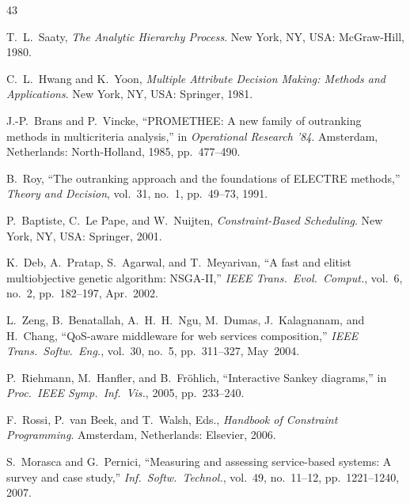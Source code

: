 \documentclass[journal]{IEEEtran}
\begin{document}

\begin{thebibliography}{43}

T.~L.~Saaty, \emph{The Analytic Hierarchy Process}. New York, NY, USA:
  McGraw-Hill, 1980.

C.~L.~Hwang and K.~Yoon, \emph{Multiple Attribute Decision Making: Methods and
  Applications}. New York, NY, USA: Springer, 1981.

J.-P.~Brans and P.~Vincke, ``PROMETHEE: A new family of outranking methods in
  multicriteria analysis,'' in \emph{Operational Research '84}. Amsterdam,
  Netherlands: North-Holland, 1985, pp.~477--490.

B.~Roy, ``The outranking approach and the foundations of ELECTRE methods,''
  \emph{Theory and Decision}, vol.~31, no.~1, pp.~49--73, 1991.

P.~Baptiste, C.~Le Pape, and W.~Nuijten, \emph{Constraint-Based Scheduling}.
  New York, NY, USA: Springer, 2001.

K.~Deb, A.~Pratap, S.~Agarwal, and T.~Meyarivan, ``A fast and elitist
  multiobjective genetic algorithm: NSGA-II,'' \emph{IEEE Trans.\ Evol.\
  Comput.}, vol.~6, no.~2, pp.~182--197, Apr.~2002.

L.~Zeng, B.~Benatallah, A.~H.~H.~Ngu, M.~Dumas, J.~Kalagnanam, and H.~Chang,
  ``QoS-aware middleware for web services composition,'' \emph{IEEE Trans.\ Softw.\
  Eng.}, vol.~30, no.~5, pp.~311--327, May~2004.

P.~Riehmann, M.~Hanfler, and B.~Fr{\"o}hlich, ``Interactive Sankey diagrams,''
  in \emph{Proc.\ IEEE Symp.\ Inf.\ Vis.}, 2005, pp.~233--240.

F.~Rossi, P.~van Beek, and T.~Walsh, Eds., \emph{Handbook of Constraint
  Programming}. Amsterdam, Netherlands: Elsevier, 2006.

S.~Morasca and G.~Pernici, ``Measuring and assessing service-based systems: A
  survey and case study,'' \emph{Inf.\ Softw.\ Technol.}, vol.~49, no.~11--12,
  pp.~1221--1240, 2007.


\end{thebibliography}
\end{document}
